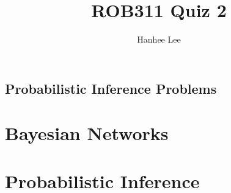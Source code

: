 \documentclass{article}
\title{ROB311 Quiz 2}
\author{Hanhee Lee}
\begin{document}
\maketitle

\tableofcontents
\newpage

\begin{center}
    \section*{Probabilistic Inference Problems}
\end{center}

\section{Bayesian Networks}

\newpage

\section{Probabilistic Inference}

\newpage
\end{document}
